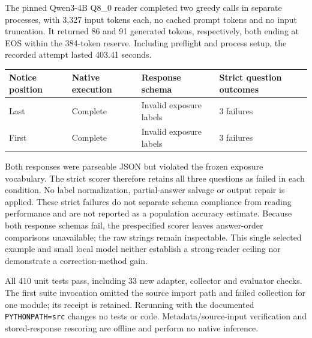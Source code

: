 The pinned Qwen3-4B Q8\_0 reader completed two greedy calls in separate processes, with 3,327 input tokens each, no cached prompt tokens and no input truncation. It returned 86 and 91 generated tokens, respectively, both ending at EOS within the 384-token reserve. Including preflight and process setup, the recorded attempt lasted 403.41 seconds.

\begin{center}
\begin{tabular}{llll}
\toprule
Notice position & Native execution & Response schema & Strict question outcomes\\
\midrule
Last & Complete & Invalid exposure labels & 3 failures\\
First & Complete & Invalid exposure labels & 3 failures\\
\bottomrule
\end{tabular}
\end{center}

Both responses were parseable JSON but violated the frozen exposure vocabulary. The strict scorer therefore retains all three questions as failed in each condition. No label normalization, partial-answer salvage or output repair is applied. These strict failures do not separate schema compliance from reading performance and are not reported as a population accuracy estimate. Because both response schemas fail, the prespecified scorer leaves answer-order comparisons unavailable; the raw strings remain inspectable. This single selected example and small local model neither establish a strong-reader ceiling nor demonstrate a correction-method gain.

All 410 unit tests pass, including 33 new adapter, collector and evaluator checks. The first suite invocation omitted the source import path and failed collection for one module; its receipt is retained. Rerunning with the documented \texttt{PYTHONPATH=src} changes no tests or code. Metadata/source-input verification and stored-response rescoring are offline and perform no native inference.

